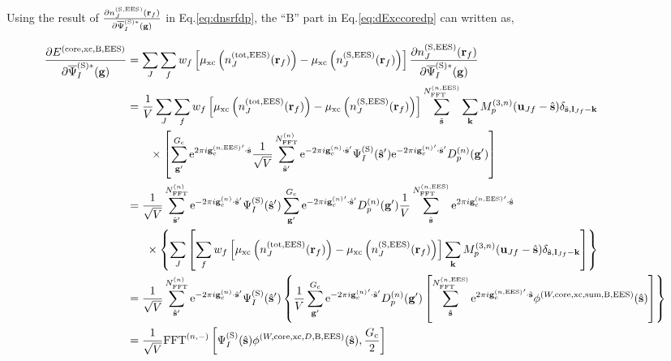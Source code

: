 \documentclass[paper=a4, fontsize=11pt]{article} %
\numberwithin{equation}{section} %
\numberwithin{figure}{section} %
\numberwithin{table}{section} %
\newcommand{\p}{\partial}
\newcommand{\bu}{{\bf{u}}}
\newcommand{\bl}{{\bf{l}}}
\newcommand{\bk}{{\bf{k}}}
\newcommand{\bs}{{\bf{s}}}
\newcommand{\bg}{{\bf{g}}}
\newcommand{\br}{{\bf{r}}}
\newcommand{\hs}{{\hat{\bf{s}}}}
\newcommand{\rS}{{\mathrm{S}}}
\newcommand{\rEES}{{\mathrm{EES}}}
\newcommand{\rxc}{{\mathrm{xc}}}
\newcommand{\rcore}{{\mathrm{core}}}
\newcommand{\re}{{\mathrm{e}}}
\newcommand{\rB}{{\mathrm{B}}}
\newcommand{\rsum}{{\mathrm{sum}}}
\newcommand{\rtot}{{\mathrm{tot}}}
\newcommand{\gcn}{{\bg_c^{(n)}}}
\newcommand{\gcnEES}{{\bg_c^{(n,\rEES)}}}
\newcommand{\igpcnEESs}{2\pi i\gcnEES'\cdot\hat \bs}
\newcommand{\psigsc}{{\overline \Psi_I^{(\rS)*}(\bg)}}
\newcommand{\NFFTn}{{N^{(n)}_{\mathrm{FFT}}}}
\newcommand{\NFFTnEES}{{N^{(n,\rEES)}_{\mathrm{FFT}}}}
\newcommand{\Gc}{{G_{\mathrm{c}}}}
\newcommand{\hGc}{{\frac{G_{\mathrm{c}}}{2}}}
\newcommand{\Mn}{{M_p^{(3,n)}}}
\newcommand{\FFTni}{{\mathrm{FFT}^{(n,-)}}}
\begin{document}
Using the result of $\frac{\p n_J^{(\rS,\rEES)}(\br_f)}{\p \psigsc} $ in Eq.\eqref{eq:dnsrfdp}, the ``$\rB$'' part in Eq.\eqref{eq:dExccoredp} can written as,

\begin{equation}
\begin{split}
\frac{\p E^{(\rcore,\rxc,\rB,\rEES)}}{\p \psigsc}
&= \sum_J \sum_f w_f \left[\mu_{\rxc} \left(  n^{(\rtot,\rEES)}_J(\br_f)  \right) -\mu_{\rxc}\left(n_J^{(\rS,\rEES)}(\br_f)\right)\right] \frac{\p n_J^{(\rS,\rEES)}(\br_f)}{\p \psigsc}  \\
&= \frac{1}{V} \sum_J \sum_f w_f \left[\mu_{\rxc} \left(  n^{(\rtot,\rEES)}_J(\br_f)  \right) -\mu_{\rxc}\left(n_J^{(\rS,\rEES)}(\br_f)\right)\right]  \sum_{\hat \bs}^\NFFTnEES \sum_{\bk} \Mn(\bu_{Jf}-\hat \bs)\delta_{\hat \bs,\bl_{Jf}-\bk}\\
&\ \ \ \ \ \ \times \left[\sum_{\bg'}^\Gc \re^{\igpcnEESs} \frac{1}{\sqrt V} \sum_{\hat \bs'}^\NFFTn   \re^{-2\pi i \gcn \cdot \hat \bs'} \Psi_{I}^{(\rS)}(\hat \bs') \re^{-2\pi i \gcn' \cdot \hat \bs'} D^{(n)}_p(\bg') \right]  \\
&= \frac{1}{\sqrt V} \sum_{\hat \bs'}^\NFFTn   \re^{-2\pi i \gcn \cdot \hat \bs'}\Psi_{I}^{(\rS)}(\hat \bs')  \sum_{\bg'}^\Gc   \re^{-2\pi i \gcn' \cdot \hat \bs'} D^{(n)}_p(\bg')  \frac{1}{V} \sum_{\hat \bs}^\NFFTnEES \re^{\igpcnEESs} \\ 
&\ \ \ \ \ \times \left\{\sum_J \left[\sum_f w_f \left[\mu_{\rxc} \left(  n^{(\rtot,\rEES)}_J(\br_f)  \right) -\mu_{\rxc}\left(n_J^{(\rS,\rEES)}(\br_f)\right)\right] \sum_{\bk} \Mn(\bu_{Jf}-\hat \bs)\delta_{\hat \bs,\bl_{Jf}-\bk}\right]\right\} \\
&= \frac{1}{\sqrt V} \sum_{\hat \bs'}^\NFFTn   \re^{-2\pi i \gcn \cdot \hat \bs'}\Psi_{I}^{(\rS)}(\hat \bs') \left\{\frac{1}{V}  \sum_{\bg'}^\Gc   \re^{-2\pi i \gcn' \cdot \hat \bs'} D^{(n)}_p(\bg') \left[\sum_{\hat \bs}^\NFFTnEES \re^{\igpcnEESs} \phi^{(W,\rcore,\rxc,\rsum,\rB,\rEES)}(\hs)\right]\right\} \\
&= \frac{1}{\sqrt V} \FFTni \left[\Psi_{I}^{(\rS)}(\hat \bs) \phi^{(W,\rcore,\rxc,D,\rB,\rEES)}(\hs),\hGc \right]\\
\end{split}
\end{equation}
\end{document}

